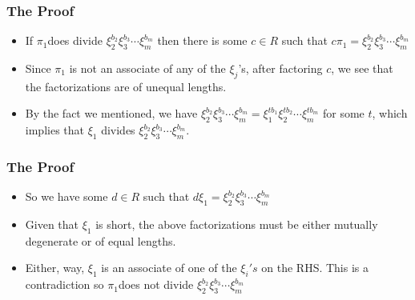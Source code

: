\begin{frame}
  \frametitle{The Proof}
  \begin{itemize}
    \item If $\pi_{1}$does divide $\xi_{2}^{b_{2}}\xi_{3}^{b_{3}}\cdots\xi_{m}^{b_{m}}$ then there is some $c\in R$ such that $c\pi_{1}=\xi_{2}^{b_{2}}\xi_{3}^{b_{3}}\cdots\xi_{m}^{b_{m}}$
  \end{itemize}

  \pause{}
  \begin{itemize}
    \item Since $\pi_1$ is not an associate of any of the $\xi_j$'s, after factoring $c$, we see that the factorizations are of unequal lengths.
  \end{itemize}

  \pause{}
  \begin{itemize}
    \item By the fact we mentioned, we have $\xi_{2}^{b_{2}}\xi_{3}^{b_{3}}\cdots\xi_{m}^{b_{m}}=\xi_{1}^{tb_{1}}\xi_{2}^{tb_{2}}\cdots\xi_{m}^{tb_{m}}$ for some $t$, which implies that $\xi_{1}$ divides $\xi_{2}^{b_{2}}\xi_{3}^{b_{3}}\cdots\xi_{m}^{b_{m}}$.
  \end{itemize}
\end{frame}

\begin{frame}
  \frametitle{The Proof}
  \begin{itemize}
    \item So we have some $d\in R$ such that $d\xi_{1}=\xi_{2}^{b_{2}}\xi_{3}^{b_{3}}\cdots\xi_{m}^{b_{m}}$
  \end{itemize}

  \pause{}
  \begin{itemize}
    \item Given that $\xi_{1}$ is short, the above factorizations must be either mutually degenerate or of equal lengths.
  \end{itemize}

  \pause{}
  \begin{itemize}
    \item Either, way, $\xi_{1}$ is an associate of one of the $\xi_{i}'s$ on the RHS. This is a contradiction so $\pi_{1}$does not divide $\xi_{2}^{b_{2}}\xi_{3}^{b_{3}}\cdots\xi_{m}^{b_{m}}$
  \end{itemize}
\end{frame}

